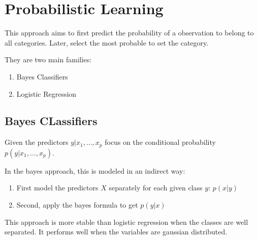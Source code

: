 \section{Probabilistic Learning}
This approach aims to first predict the probability of a observation to belong
to all categories. Later, select the most probable to set the category.

They are two main families:
\begin{enumerate}
    \item Bayes Classifiers
    \item Logistic Regression
\end{enumerate}

\subsection{Bayes CLassifiers}
Given the predictors $y | x_1,\dots,x_p$ focus on the conditional probability $p(y | x_1,\dots,x_p)$.

In the bayes approach,  this is modeled in an indirect way:
\begin{enumerate}
    \item First model the predictors $X$ separately for each given class $y$: $p(x|y)$
    \item Second, apply the bayes formula to get $p(y|x)$ 
\end{enumerate}

This approach is more stable than logistic regression when the classes are well
separated. It performs well when the variables are gaussian distributed.

